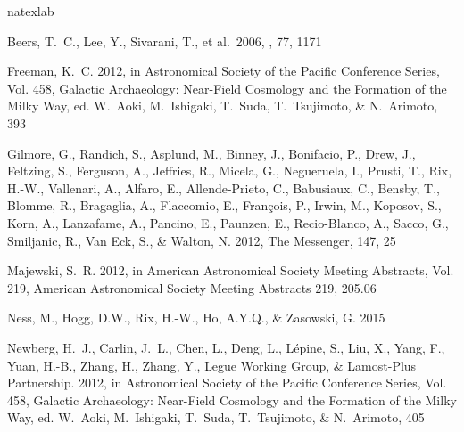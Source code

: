 \documentclass[12pt, preprint]{aastex}
\begin{document}
\begin{thebibliography}{24}
\expandafter\ifx\csname natexlab\endcsname\relax\def\natexlab#1{#1}\fi

 Beers, T.~C., Lee, Y., 
Sivarani, T., et al.\ 2006, \memsai, 77, 1171 

{Freeman}, K.~C. 2012, in Astronomical Society of the Pacific Conference
  Series, Vol. 458, Galactic Archaeology: Near-Field Cosmology and the
  Formation of the Milky Way, ed. W.~{Aoki}, M.~{Ishigaki}, T.~{Suda},
  T.~{Tsujimoto}, \& N.~{Arimoto}, 393

{Gilmore}, G., {Randich}, S., {Asplund}, M., {Binney}, J., {Bonifacio}, P.,
  {Drew}, J., {Feltzing}, S., {Ferguson}, A., {Jeffries}, R., {Micela}, G.,
  {Negueruela}, I., {Prusti}, T., {Rix}, H.-W., {Vallenari}, A., {Alfaro}, E.,
  {Allende-Prieto}, C., {Babusiaux}, C., {Bensby}, T., {Blomme}, R.,
  {Bragaglia}, A., {Flaccomio}, E., {Fran{\c c}ois}, P., {Irwin}, M.,
  {Koposov}, S., {Korn}, A., {Lanzafame}, A., {Pancino}, E., {Paunzen}, E.,
  {Recio-Blanco}, A., {Sacco}, G., {Smiljanic}, R., {Van Eck}, S., \& {Walton},
  N. 2012, The Messenger, 147, 25

{Majewski}, S.~R. 2012, in American Astronomical Society Meeting Abstracts,
  Vol. 219, American Astronomical Society Meeting Abstracts 219, 205.06

{Ness}, M., {Hogg}, D.W., {Rix}, H.-W., {Ho}, A.Y.Q., \& {Zasowski}, G. 2015

{Newberg}, H.~J., {Carlin}, J.~L., {Chen}, L., {Deng}, L., {L{\'e}pine}, S.,
  {Liu}, X., {Yang}, F., {Yuan}, H.-B., {Zhang}, H., {Zhang}, Y., {Legue
  Working Group}, \& {Lamost-Plus Partnership}. 2012, in Astronomical Society
  of the Pacific Conference Series, Vol. 458, Galactic Archaeology: Near-Field
  Cosmology and the Formation of the Milky Way, ed. W.~{Aoki}, M.~{Ishigaki},
  T.~{Suda}, T.~{Tsujimoto}, \& N.~{Arimoto}, 405


\end{thebibliography}
\end{document}
